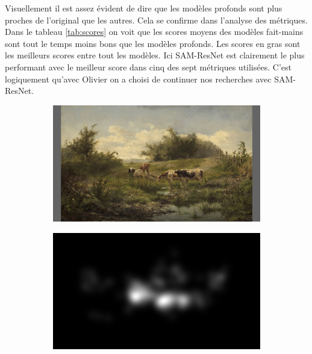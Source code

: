 \par
Visuellement il est assez évident de dire que les modèles profonds sont plus proches de l'original que les autres. Cela se confirme dans l'analyse des métriques. Dans le tableau \ref{tab:scores} on voit que les scores moyens des modèles fait-mains sont tout le temps moins bons que les modèles profonds. Les scores en gras sont les meilleurs scores entre tout les modèles. Ici SAM-ResNet est clairement le plus performant avec le meilleur score dans cinq des sept métriques utilisées. C'est logiquement qu'avec Olivier on a choisi de continuer nos recherches avec SAM-ResNet.

\vfill

\begin{figure}[ht]
    \centering
    \begin{subfigure}{0.24\textwidth}
        \includegraphics[width=\linewidth]{datas/predictions/stimulus_cows_at_a_pond_Bilders_1856.jpg}
        \caption{}
    \end{subfigure}
    \begin{subfigure}{0.24\textwidth}
        \includegraphics[width=\linewidth]{datas/predictions/human_cows_at_a_pond_Bilders_1856.jpg}
        \caption{}
    \end{subfigure}


\end{figure}
